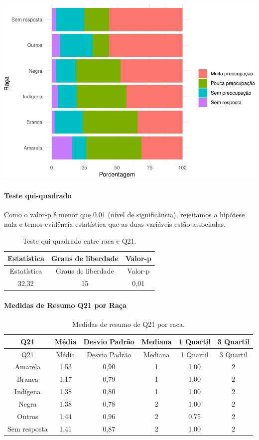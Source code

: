 \documentclass[]{article}
\let\oldparagraph\paragraph
\renewcommand{\paragraph}[1]{\oldparagraph{#1}\mbox{}}
\begin{document}
\begin{center}\includegraphics[width=0.75\linewidth]{relatorio_covid19_files/figure-latex/unnamed-chunk-456-1} \end{center}

\hypertarget{teste-qui-quadrado-40}{%
\paragraph{Teste qui-quadrado}\label{teste-qui-quadrado-40}}

Como o valor-p é menor que 0.01 (nível de significância), rejeitamos a hipótese nula e temos evidência estatística que as duas variáveis estão associadas.

\begin{longtable}[]{@{}ccc@{}}
\caption{\label{tab:unnamed-chunk-458}Teste qui-quadrado entre raca e Q21.}\tabularnewline
\toprule
Estatística & Graus de liberdade & Valor-p\tabularnewline
\midrule
\endfirsthead
\toprule
Estatística & Graus de liberdade & Valor-p\tabularnewline
\midrule
\endhead
32,32 & 15 & 0,01\tabularnewline
\bottomrule
\end{longtable}

\cleardoublepage

\hypertarget{medidas-de-resumo-q21-por-rauxe7a}{%
\paragraph{Medidas de Resumo Q21 por Raça}\label{medidas-de-resumo-q21-por-rauxe7a}}

\begin{longtable}[]{@{}cccccc@{}}
\caption{\label{tab:unnamed-chunk-459}Medidas de resumo de Q21 por raca.}\tabularnewline
\toprule
Q21 & Média & Desvio Padrão & Mediana & 1 Quartil & 3 Quartil\tabularnewline
\midrule
\endfirsthead
\toprule
Q21 & Média & Desvio Padrão & Mediana & 1 Quartil & 3 Quartil\tabularnewline
\midrule
\endhead
Amarela & 1,53 & 0,90 & 1 & 1,00 & 2\tabularnewline
Branca & 1,17 & 0,79 & 1 & 1,00 & 2\tabularnewline
Indígena & 1,38 & 0,80 & 1 & 1,00 & 2\tabularnewline
Negra & 1,38 & 0,78 & 2 & 1,00 & 2\tabularnewline
Outros & 1,44 & 0,96 & 2 & 0,75 & 2\tabularnewline
Sem resposta & 1,41 & 0,87 & 2 & 1,00 & 2\tabularnewline
\bottomrule
\end{longtable}
\end{document}
